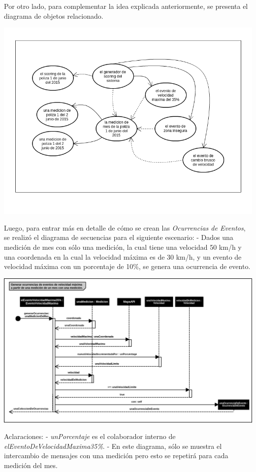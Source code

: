 Por otro lado, para complementar la idea explicada anteriormente, se presenta el diagrama
de objetos relacionado.


\centerline{\includegraphics[width=1\textwidth]{./imagenes/objetos_general.png}}


Luego, para entrar más en detalle de cómo se crean las \textit{Ocurrencias de Eventos},
se realizó el diagrama de secuencias para el siguiente escenario:
\newline
- Dados una medición de mes con sólo una medición, la cual tiene una velocidad 50 km/h y una
coordenada en la cual la velocidad máxima es de 30 km/h, y un evento de velocidad máxima con 
un porcentaje de 10\%, se genera una ocurrencia de evento.
\newline
\centerline{\includegraphics[width=1\textwidth]{./imagenes/secuencias_velmax.png}}


Aclaraciones:
\newline
- \textit{unPorcentaje} es el colaborador interno de \textit{elEventoDeVelocidadMaxima35\%}.
\newline
- En este diagrama, sólo se muestra el intercambio de mensajes con una medición pero esto se 
repetirá para cada medición del mes.



